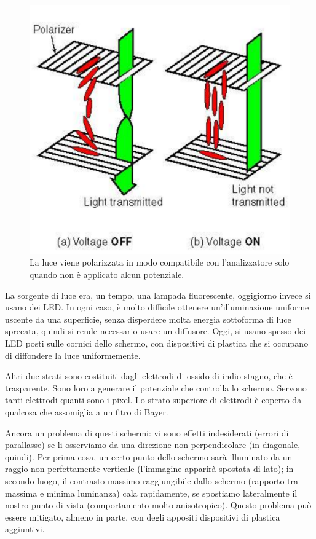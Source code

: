 \documentclass[a4paper,11pt]{article}
\begin{document}
\newpage
\renewcommand{\thefigure}{4.6}
\begin{figure}[!h]
  \centering
    \includegraphics[scale=0.4]{images/4/example_lcd.png}
    \caption{La luce viene polarizzata in modo compatibile con l'analizzatore solo quando non è applicato alcun potenziale.}
\end{figure}

La sorgente di luce era, un tempo, una lampada fluorescente, oggigiorno invece si usano dei LED. In ogni caso, è molto difficile ottenere
un'illuminazione uniforme uscente da una superficie, senza disperdere molta energia sottoforma di luce sprecata, quindi si rende necessario usare un diffusore.
Oggi, si usano spesso dei LED posti sulle cornici dello schermo, con dispositivi di plastica che si occupano di diffondere la luce uniformemente.
\par
Altri due strati sono costituiti dagli elettrodi di ossido di indio-stagno, che è trasparente. Sono loro a generare il potenziale che controlla lo schermo. Servono
tanti elettrodi quanti sono i pixel. Lo strato superiore di elettrodi è coperto da qualcosa che assomiglia a un fitro di Bayer.
\par
Ancora un problema di questi schermi: vi sono effetti indesiderati (errori di parallasse) se li osserviamo da una direzione non perpendicolare (in diagonale, quindi).
Per prima cosa, un certo punto dello schermo sarà illuminato da un raggio non perfettamente
verticale (l'immagine apparirà spostata di lato); in secondo luogo, il contrasto massimo raggiungibile dallo schermo
(rapporto tra massima e minima luminanza) cala rapidamente, se spostiamo lateralmente il nostro punto
di vista (comportamento molto anisotropico). Questo problema può essere mitigato, almeno in parte, con degli appositi dispositivi di plastica aggiuntivi.
\end{document}
